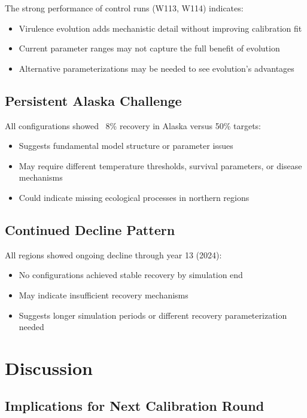 \documentclass[11pt,a4paper]{article}
\begin{document}
The strong performance of control runs (W113, W114) indicates:
\begin{itemize}
\item Virulence evolution adds mechanistic detail without improving calibration fit
\item Current parameter ranges may not capture the full benefit of evolution
\item Alternative parameterizations may be needed to see evolution's advantages
\end{itemize}

\subsection{Persistent Alaska Challenge}

All configurations showed ~8\% recovery in Alaska versus 50\% targets:
\begin{itemize}
\item Suggests fundamental model structure or parameter issues
\item May require different temperature thresholds, survival parameters, or disease mechanisms
\item Could indicate missing ecological processes in northern regions
\end{itemize}

\subsection{Continued Decline Pattern}

All regions showed ongoing decline through year 13 (2024):
\begin{itemize}
\item No configurations achieved stable recovery by simulation end
\item May indicate insufficient recovery mechanisms
\item Suggests longer simulation periods or different recovery parameterization needed
\end{itemize}

\section{Discussion}

\subsection{Implications for Next Calibration Round}
\end{document}
